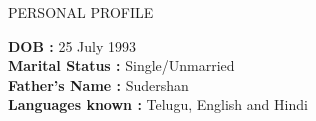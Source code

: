 \documentclass{resume} %
\begin{document}
\begin{rSection}{PERSONAL PROFILE}

  \textbf {DOB :} 25 July 1993\\
  \textbf {Marital Status :} Single/Unmarried \\
  \textbf {Father's Name : } Sudershan \\
  \textbf {Languages known :} Telugu, English and Hindi \\

\end{rSection}
\end{document}
